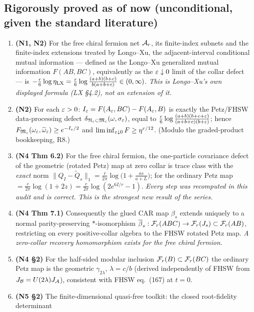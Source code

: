 \documentclass[11pt]{article}
\newcommand{\NI}{N1}\newcommand{\NII}{N2}\newcommand{\NIII}{N3}
\newcommand{\NIV}{N4}\newcommand{\NV}{N5}\newcommand{\NVI}{N6}\newcommand{\NVII}{N7}
\newcommand{\CMI}{I}
\newcommand{\MI}{F}
\renewcommand{\cB}{\mathcal B}
\begin{document}
\subsection{Rigorously proved as of now (unconditional, given the standard literature)}
\begin{enumerate}[leftmargin=1.7em]
\item[P1.] \textbf{(\NI, \NII)} For the free chiral fermion net $\mathcal A_r$, its finite-index subnets and the finite-index
extensions treated by Longo--Xu, the adjacent-interval conditional mutual information --- defined as the Longo--Xu
generalized mutual information $\MI(AB,BC)$, equivalently as the $\varepsilon\downarrow0$ limit of the collar defect --- is
$-\frac r6\log\eta_{\rm LX}=\frac r6\log\frac{(a+b)(b+c)}{b(a+b+c)}\in(0,\infty)$.
\emph{This is Longo--Xu's own displayed formula (LX \S4.2), not an extension of it.}
\item[P2.] \textbf{(\NII)} For each $\varepsilon>0$: $\CMI_\eps=\MI(A_\eps,BC)-\MI(A_\eps,B)$ is exactly the
Petz/FHSW data-processing defect $\delta_{\mathfrak N_\varepsilon\subset\mathfrak M_\varepsilon}(\omega,\sigma_\varepsilon)$, equal to
$\frac r6\log\frac{(a+b)(b+c+\varepsilon)}{(a+b+c)(b+\varepsilon)}$; hence $F_{\cM_\eps}(\omega_\eps,\widetilde\omega_\eps)\ge
e^{-\CMI_\eps/2}$ and $\liminf_{\varepsilon\downarrow0}F\ge\eta^{r/12}$.
(Modulo the graded-product bookkeeping, R8.)
\item[P3.] \textbf{(\NIV{} Thm 6.2)} For the free chiral fermion, the one-particle covariance defect of the geometric
(rotated Petz) map at zero collar is trace class with the \emph{exact} norm
$\|Q_I-\widetilde Q_s\|_1=\frac r{2\pi}\log\bigl(1+\frac{as}{a+L}\bigr)$; for the ordinary Petz map
$=\frac r{2\pi}\log(1+2z)=\frac r{2\pi}\log(2e^{6\CMI/r}-1)$.
\emph{Every step was recomputed in this audit and is correct.  This is the strongest new result of the series.}
\item[P4.] \textbf{(\NIV{} Thm 7.1)} Consequently the glued CAR map $\beta_s$ extends uniquely to a normal
parity-preserving $*$-isomorphism $\overline\beta_s:\mathcal F_r(ABC)\to\mathcal F_r(J_s)\subset\mathcal F_r(AB)$, restricting on every
positive-collar algebra to the FHSW rotated Petz map.  \emph{A zero-collar recovery homomorphism exists for the free
chiral fermion.}
\item[P5.] \textbf{(\NIV{} \S2)} For the half-sided modular inclusion $\mathcal F_r(B)\subset\mathcal F_r(BC)$ the ordinary Petz map
is the geometric $\gamma_{2\lambda}$, $\lambda=c/b$ (derived independently of FHSW from $J_\cB=U(2\lambda)J_\cA$),
consistent with FHSW eq.~(167) at $t=0$.
\item[P6.] \textbf{(\NV{} \S2)} The finite-dimensional quasi-free toolkit: the closed root-fidelity determinant

\end{enumerate}
\end{document}
